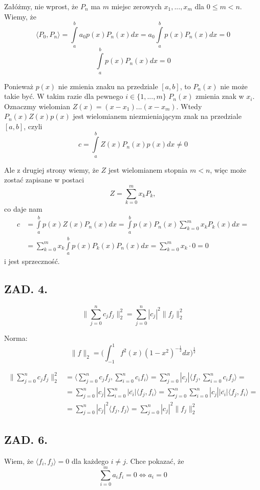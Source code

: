 \documentclass{article}[16pt]
\begin{document}
Załóżmy, nie wprost, że $P_n$ ma $m$ miejsc zerowych $x_1,...,x_m$ dla $0\leq m<n$. Wiemy, że
$$\langle P_0,P_n\rangle=\int\limits_{a}^ba_0p(x)P_n(x)dx=a_0\int\limits_a^bp(x)P_n(x)dx=0$$
$$\int\limits_a^bp(x)P_n(x)dx=0$$

Ponieważ $p(x)$ nie zmienia znaku na przedziale $[a,b]$, to $P_n(x)$ nie może takie być. W takim razie dla pewnego $i\in\{1,...,m\}$ $P_n(x)$ zmienia znak w $x_i$. Oznaczmy wielomian $Z(x)=(x-x_1)...(x-x_m)$. Wtedy $P_n(x)Z(x)p(x)$ jest wielomianem niezmieniającym znak na przedziale $[a, b]$, czyli
$$c=\int\limits_a^bZ(x)P_n(x)p(x)dx\neq 0$$

Ale z drugiej strony wiemy, że $Z$ jest wielomianem stopnia $m<n$, więc może zostać zapisane w postaci
$$Z=\sum\limits_{k=0}^mx_kP_k,$$
co daje nam
\begin{align*}
    c&=\int\limits_a^bp(x)Z(x)P_n(x)dx=\int\limits_a^bp(x)P_n(x)\sum\limits_{k=0}^mx_kP_k(x)dx=\\
    &=\sum\limits_{k=0}^mx_k\int\limits_a^bp(x)P_k(x)P_n(x)dx=\sum\limits_{k=0}^mx_k\cdot 0=0
\end{align*}
i jest sprzeczność.

\subsection*{ZAD. 4.}

$$\Big\|\sum\limits_{j=0}^nc_jf_j\Big\|_2^2=\sum\limits_{j=0}^n|c_j|^2\|f_j\|_2^2$$

Norma:
$$\|f\|_2=\Big(\int_{-1}^1f^2(x)(1-x^2)^{-\frac12}dx\Big)^{\frac12}$$

\begin{align*}
    \|\sum\limits_{j=0}^{n}c_jf_j\|_2^2&=\langle \sum\limits_{j=0}^nc_jf_j, \sum\limits_{i=0}^nc_if_i\rangle=\sum\limits_{j=0}^n|c_j|\langle f_j,\sum\limits_{i=0}^nc_if_j\rangle=\\
    &=\sum\limits_{j=0}^n|c_j|\sum\limits_{i=0}^n|\overline{c_i}|\langle f_j,f_i\rangle=\sum\limits_{j=0}^n\sum\limits_{i=0}^n|c_j||\overline{c_i}|\langle f_j,f_i\rangle=\\
    &=\sum\limits_{j=0}^n|c_j|^2\langle f_j,f_j\rangle=\sum\limits_{j=0}^n|c_j|^2\|f_j\|^2_2
\end{align*}

\subsection*{ZAD. 6.}

Wiem, że $\langle f_i,f_j\rangle=0$ dla każdego $i\neq j$. Chce pokazać, że
$$\sum\limits_{i=0}^ma_if_i=0\iff a_i=0$$
\end{document}
